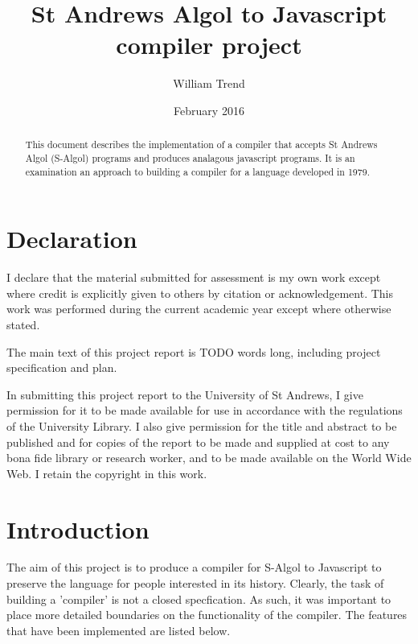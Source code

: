 \documentclass{article}
\title{St Andrews Algol to Javascript compiler project}
\author{William Trend}
\date{February 2016}
\begin{document}
\maketitle
\newpage
\tableofcontents
\newpage

\begin{abstract}
This document describes the implementation of a compiler that accepts St Andrews Algol (S-Algol) programs and produces analagous javascript programs. It is an examination an approach to building a compiler for a language developed in 1979.

\end{abstract}

\section{Declaration}
I declare that the material submitted for assessment is my own work except where credit is explicitly given to others by citation or acknowledgement. This work was performed during the current academic year except where otherwise stated.

The main text of this project report is TODO words long, including project specification and plan.

In submitting this project report to the University of St Andrews, I give permission for it to be made available for use in accordance with the regulations of the University Library. I also give permission for the title and abstract to be published and for copies of the report to be made and supplied at cost to any bona fide library or research worker, and to be made available on the World Wide Web. I retain the copyright in this work.

\section{Introduction}

The aim of this project is to produce a compiler for S-Algol to Javascript to preserve the language for people interested in its history. Clearly, the task of building a 'compiler' is not a closed specfication. As such, it was important to place more detailed boundaries on the functionality of the compiler. The features that have been implemented are listed below.
\end{document}
